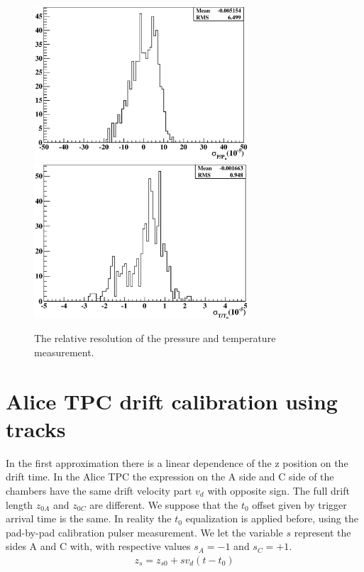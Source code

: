 \documentclass{elsart}
\begin{document}
\begin{figure}[t]
\centering
\includegraphics[width=80mm]{picDCS/deltaPoverP.eps}
\includegraphics[width=80mm]{picDCS/deltaToverT.eps}
\caption{
The relative resolution of the pressure and temperature  measurement.
} 
\label{figDCSResol}
\end{figure}



\section{ Alice TPC drift calibration using tracks}

In the first approximation there is a linear dependence of the z position on the drift time.
In the Alice TPC the expression on the A side and C side of the chambers have the same drift velocity part $v_d$ 
with opposite sign. The full drift length $z_{0A}$ and $z_{0C}$ are different. We suppose that
the $t_0$ offset given by trigger arrival time is the same. In reality the $t_0$ equalization is applied before,
using the pad-by-pad calibration pulser measurement. We let the variable $s$ represent the sides A and C with, with respective values $s_A=-1$ and $s_C=+1$. 
\begin{equation}
\begin{split}
z_s = z_{s0}+sv_d(t-t_0)
\end{split}
\end{equation}
\end{document}
